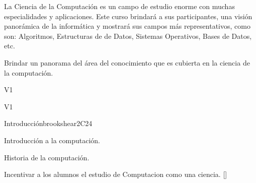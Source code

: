 \begin{syllabus}


\begin{justification}
La Ciencia de la Computación es un campo de estudio enorme con muchas especialidades y aplicaciones. Este curso brindará a sus participantes, una visión panorámica de la informática y mostrará sus campos más representativos, como son: Algoritmos, Estructuras de de Datos, Sistemas Operativos, Bases de Datos, etc.
\end{justification}

\begin{goals}
\item Brindar un panorama del área del conocimiento que es cubierta en la ciencia de la computación.
\end{goals}

\begin{outcomes}{V1}
    \item {}
    \item {}
    \item {}
    \item {}
    \item {}
\end{outcomes}

\begin{competences}{V1}
    \item {} 
    \item {} 
    \item {}
    \item {}
\end{competences}

\begin{unit}{Introducción}{}{brookshear}{2}{C24}
    \begin{topics}
	\item Introducción a la computación.
	\item Historia de la computación.
   \end{topics}
   \begin{learningoutcomes}
      \item Incentivar a los alumnos el estudio de Computacion como una ciencia. [\Familiarity]
   \end{learningoutcomes}
\end{unit}


\end{syllabus}
